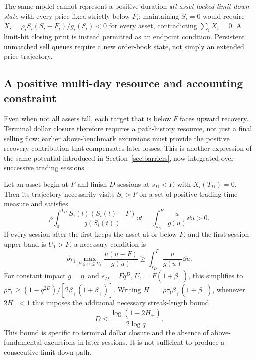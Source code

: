 \documentclass[review,hidelinks,onefignum,onetabnum]{siamonline250211}
\begin{document}
The same model cannot represent a positive-duration \emph{all-asset locked limit-down state} with every price fixed strictly below $F_i$: maintaining $\dot S_i=0$ would require
$\dot X_i=\rho_i S_i(S_i-F_i)/g_i(S_i)<0$ for every asset, contradicting $\sum_i\dot X_i=0$. A limit-hit closing print is instead permitted as an endpoint condition. Persistent unmatched sell queues require a new order-book state, not simply an extended price trajectory.

\subsection{A positive multi-day resource and accounting constraint}\label{subsec:multiday-preconditioning}
Even when not all assets fall, each target that is below $F$ faces upward recovery. Terminal dollar closure therefore requires a path-history resource, not just a final selling flow: earlier above-benchmark excursions must provide the positive recovery contribution that compensates later losses. This is another expression of the same potential introduced in Section~\ref{sec:barriers}, now integrated over successive trading sessions.
\begin{proposition}\label{prop:streak-precondition}
Let an asset begin at $F$ and finish $D$ sessions at $s_D<F$, with $X_i(T_D)=0$. Then its trajectory necessarily visits $S_i>F$ on a set of positive trading-time measure and satisfies
\begin{equation}\label{eq:streak-excursion}
 \rho\int_0^{T_D}\frac{S_i(t)(S_i(t)-F)}{g(S_i(t))}\dd t
 =\int_{s_D}^{F}\frac{u}{g(u)}\dd u>0.
\end{equation}
If every session after the first keeps the asset at or below $F$, and the first-session upper band is $U_1>F$, a necessary condition is
\begin{equation}\label{eq:streak-precondition}
 \boxed{\quad \rho\tau_1\max_{F\le u\le U_1}\frac{u(u-F)}{g(u)}
 \ge \int_{s_D}^{F}\frac{u}{g(u)}\dd u.\quad}
\end{equation}
For constant impact $g=\eta$, and $s_D=Fq^D$, $U_1=F(1+\beta_+)$, this simplifies to
$\rho\tau_1\ge(1-q^{2D})/[2\beta_+(1+\beta_+)]$.
Writing $H_+=\rho\tau_1\beta_+(1+\beta_+)$, whenever $2H_+<1$ this imposes the additional necessary streak-length bound
\begin{equation}\label{eq:multiday-preconditioning-D}
\boxed{\quad D\le \frac{\log(1-2H_+)}{2\log q}.\quad}
\end{equation}
This bound is specific to terminal dollar closure and the absence of above-fundamental excursions in later sessions. It is not sufficient to produce a consecutive limit-down path.
\end{proposition}
\end{document}
